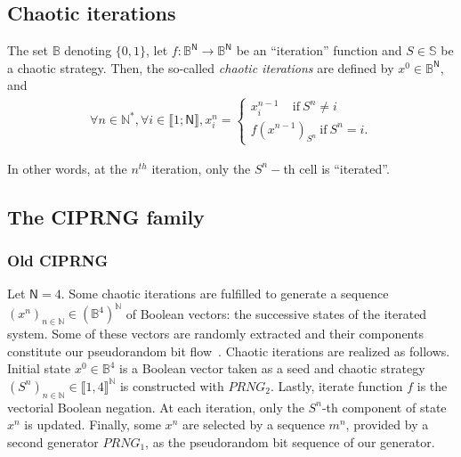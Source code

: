 \documentclass[10pt, conference, compsocconf]{IEEEtran}
\begin{document}
%
%
%
%
\subsection{Chaotic iterations}

\begin{definition}
The set $\mathds{B}$ denoting $\{0,1\}$, let $f:\mathds{B}^{\mathsf{N}%
}\longrightarrow \mathds{B}^{\mathsf{N}}$ be an ``iteration'' function and $S\in \mathbb{S}
$ be a chaotic strategy. Then, the so-called \emph{chaotic iterations} are defined by $x^0\in \mathds{B}^{\mathsf{N}}$, and
\begin{equation}
\begin{array}{l}
\forall n\in \mathds{N}^{\ast },\forall i\in \llbracket1;\mathsf{N}\rrbracket%
,x_i^n=\left\{
\begin{array}{l}
x_i^{n-1}~~~~~\text{if}~S^n\neq i \\
f(x^{n-1})_{S^n}~\text{if}~S^n=i.\end{array} \right. \end{array}
\end{equation}
\end{definition}
In other words, at the $n^{th}$ iteration, only the $S^{n}-$th cell is
\textquotedblleft iterated\textquotedblright.

\subsection{The CIPRNG family}

\subsubsection{Old CIPRNG}

Let $\mathsf{N} = 4$. Some chaotic iterations are fulfilled to generate a sequence $\left(x^n\right)_{n\in\mathds{N}} \in \left(\mathds{B}^4\right)^\mathds{N}$ of Boolean vectors: the successive states of the iterated system. Some of these vectors are randomly extracted and their components constitute our pseudorandom bit flow~\cite{bgw09:ip}.
Chaotic iterations are realized as follows. Initial state $x^0 \in \mathds{B}^4$ is a Boolean vector taken as a seed and chaotic strategy $\left(S^n\right)_{n\in\mathds{N}}\in \llbracket 1, 4 \rrbracket^\mathds{N}$ is constructed with $PRNG_2$. Lastly, iterate function $f$ is the vectorial Boolean negation.
At each iteration, only the $S^n$-th component of state $x^n$ is updated. Finally, some $x^n$ are selected by a sequence $m^n$, provided by a second generator $PRNG_1$, as the pseudorandom bit sequence of our generator.
\end{document}
